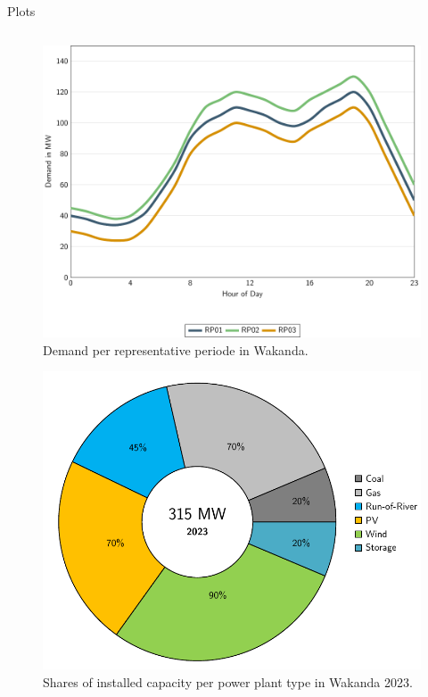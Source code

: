 \documentclass[aspectratio=169]{beamer}
\begin{document}
\begin{frame}{Plots}
\begin{columns}
\begin{column}{0.49\textwidth}
\begin{overprint}
            \begin{figure}[htbp]
                 \includegraphics[width=\linewidth]{figures/demand_rp.pdf}  %
                \caption{\centering Demand per representative periode in Wakanda.}
                \label{fig:demand}
            \end{figure}
     
            \vspace{-1cm}\begin{figure}[htbp]
                \includegraphics[width=\linewidth]
                {figures/installed_capacity_2023_percent.pdf}  %
                \caption{\centering Shares of installed capacity per power plant type in Wakanda 2023.}
                \label{fig:installed_capacity_2023}
            \end{figure}
            \end{overprint}
        \end{column}
    \end{columns}


\end{frame}
\end{document}
